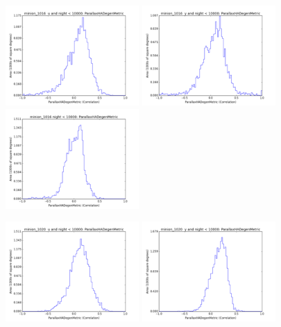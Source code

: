 \begin{figure}[ht]
  \begin{center}
  \includegraphics[width=2.0in]{./figs/milkyway/astromPanels/MW_Astrom_paDegen_Baseline_u_hst.png}
  \includegraphics[width=2.0in]{./figs/milkyway/astromPanels/MW_Astrom_paDegen_Baseline_y_hst.png}
  \includegraphics[width=2.0in]{./figs/milkyway/astromPanels/MW_Astrom_paDegen_Baseline_10y_hst.png}
  \end{center}
  \begin{center}
  \includegraphics[width=2.0in]{./figs/milkyway/astromPanels/MW_Astrom_paDegen_PanSTARRS_u_hst.png}
  \includegraphics[width=2.0in]{./figs/milkyway/astromPanels/MW_Astrom_paDegen_PanSTARRS_y_hst.png}

\end{center}
\end{figure}
